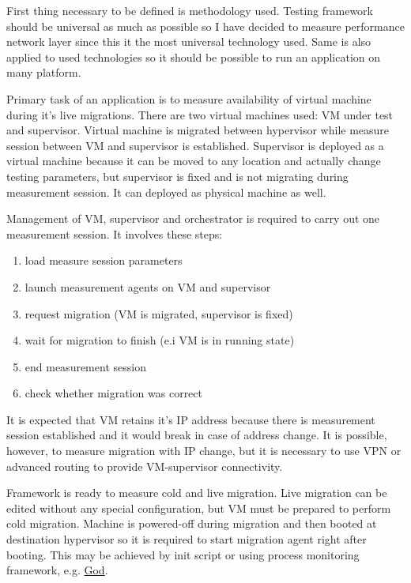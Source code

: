 
First thing necessary to be defined is methodology used. Testing framework should be universal as much as possible so I have decided to measure performance network layer since this it the most universal technology used. Same is also applied to used technologies so it should be possible to run an application on many platform. 

Primary task of an application is to measure availability of virtual machine during it's live migrations. There are two virtual machines used: \Ac{VM} under test and supervisor. Virtual machine is migrated between hypervisor while measure session between \Ac{VM} and supervisor is established. Supervisor is deployed as a virtual machine because it can be moved to any location and actually change testing parameters, but supervisor is fixed and is not migrating during measurement session. It can deployed as physical machine as well.

Management of \Ac{VM}, supervisor and orchestrator is required to carry out one measurement session. It involves these steps:
\begin{enumerate}
	\item load measure session parameters
	\item launch measurement agents on \Ac{VM} and supervisor
	\item request migration (\Ac{VM} is migrated, supervisor is fixed)
	\item wait for migration to finish (e.i \Ac{VM} is in running state)
	\item end measurement session
	\item check whether migration was correct
\end{enumerate}

It is expected that \Ac{VM} retains it's \Ac{IP} address because there is measurement session established and it would break in case of address change. It is possible, however, to measure migration with \Ac{IP} change, but it is necessary to use \Ac{VPN} or advanced routing to provide \Ac{VM}-supervisor connectivity.

Framework is ready to measure cold and live migration. Live migration can be edited without any special configuration, but \Ac{VM} must be prepared to perform cold migration. Machine is powered-off during migration and then booted at destination hypervisor so it is required to start migration agent right after booting. This may be achieved by init script or using process monitoring framework, e.g. \href{http://godrb.com/}{God}.

